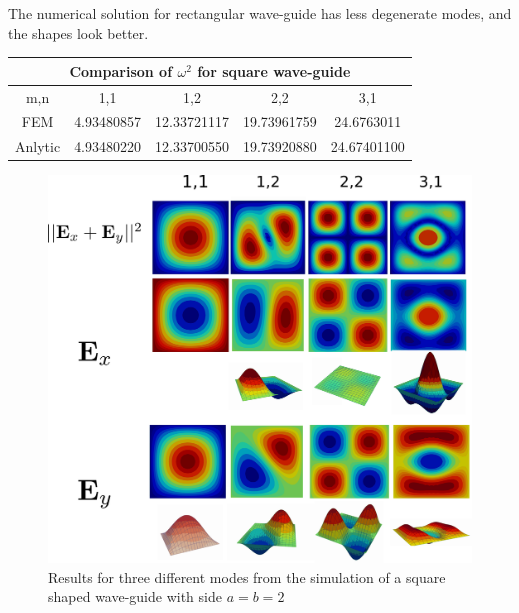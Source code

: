 The numerical solution for rectangular wave-guide has less degenerate modes, and the shapes look better.
\begin{center}
\begin{tabular}{|c|c|c|c|c|}
\hline
\multicolumn{5}{|c|}{Comparison of $\omega^2$ for square wave-guide} \\
\hline 
m,n & 1,1 & 1,2 & 2,2 & 3,1 \\ 
\hline 
FEM & 4.93480857 & 12.33721117 & 19.73961759 & 24.6763011 \\ 
\hline 
Anlytic & 4.93480220 & 12.33700550 & 19.73920880 & 24.67401100 \\ 
\hline 
\end{tabular} 
\label{tab:sq_wav_comparison}
\end{center}

\begin{figure}
\centering
\includegraphics[scale=0.1]{./img/square_waveguide.pdf}
\caption{Results for three different modes from the simulation of a square shaped wave-guide with side $a=b=2$}
\label{fig:square_waveguide}
\end{figure}

